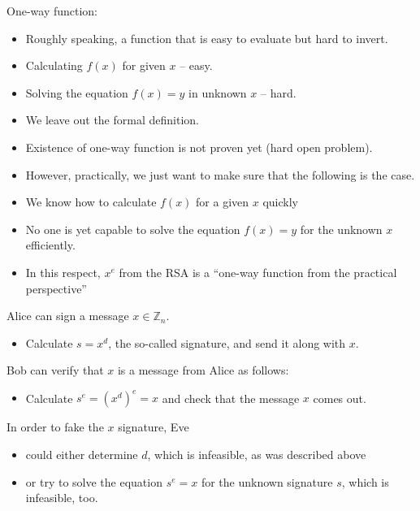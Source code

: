 \documentclass{beamer}
\newcommand{\Z}{\mathbb{Z}}
\begin{document}
\begin{frame}
	One-way function: 
	\begin{itemize}[<+->]
		\item Roughly speaking, a function that is easy to evaluate but hard to invert. 
		\item Calculating $f(x)$ for given $x$ -- easy. 
		\item Solving the equation $f(x) =y$ in unknown $x$ -- hard. 
		\item We leave out the formal definition. 
		\item Existence of one-way function is not proven yet (hard open problem). 
		\item However, practically, we just want to make sure that the following is the case. 
		\item We know how to calculate $f(x)$ for a given $x$ quickly
		\item No one  is yet capable to solve the equation $f(x) = y$ for the unknown $x$ efficiently. 
		\item In this respect, $x^e$ from the RSA is a ``one-way function from the practical perspective''
	\end{itemize} 
\end{frame} 

\begin{frame} 
	Alice can sign a message $x \in \Z_n$. 
	\begin{itemize}[<+->] 
		\item Calculate $s = x^d$, the so-called signature, and send it along with $x$.
	\end{itemize} 
	\pause 
	Bob can verify that $x$ is a message from Alice as follows: 
	\begin{itemize}[<+->]
		\item Calculate $s^e = (x^d)^e = x$ and check that the message $x$ comes out. 
	\end{itemize} 
	In order to fake the $x$ signature, Eve
	\begin{itemize} 
		\item could either determine $d$, which is infeasible, as was described above 
		\item or try to solve the equation $s^e = x$ for the unknown signature $s$, which is infeasible, too. 
	\end{itemize} 
\end{frame} 
\end{document}
